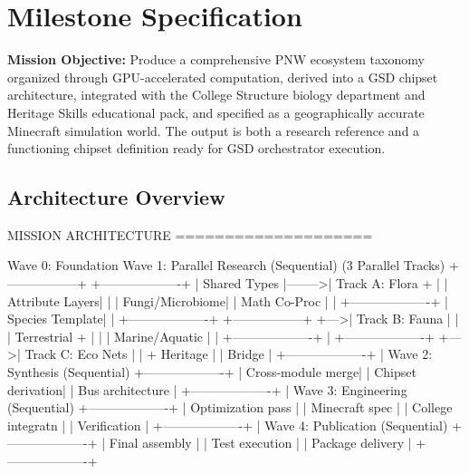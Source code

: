 \documentclass[11pt,letterpaper]{article}
\newcommand{\metafield}[2]{\textbf{\sffamily #1} #2\par}
\begin{document}
\section{Milestone Specification}

\metafield{Mission Objective:}{Produce a comprehensive PNW ecosystem taxonomy organized through GPU-accelerated computation, derived into a GSD chipset architecture, integrated with the College Structure biology department and Heritage Skills educational pack, and specified as a geographically accurate Minecraft simulation world. The output is both a research reference and a functioning chipset definition ready for GSD orchestrator execution.}

\subsection{Architecture Overview}

\begin{asciibox}
                    MISSION ARCHITECTURE
                    ====================

  Wave 0: Foundation           Wave 1: Parallel Research
  (Sequential)                 (3 Parallel Tracks)
  +-----------------+         +-------------------+
  | Shared Types    |-------->| Track A: Flora +  |
  | Attribute Layers|    |    |   Fungi/Microbiome|
  | Math Co-Proc    |    |    +-------------------+
  | Species Template|    |    +-------------------+
  +-----------------+    +--->| Track B: Fauna    |
                         |    |   Terrestrial +   |
                         |    |   Marine/Aquatic   |
                         |    +-------------------+
                         |    +-------------------+
                         +--->| Track C: Eco Nets |
                              |   + Heritage      |
                              |   Bridge          |
                              +-------------------+
                                       |
                              Wave 2: Synthesis (Sequential)
                              +-------------------+
                              | Cross-module merge|
                              | Chipset derivation|
                              | Bus architecture  |
                              +-------------------+
                                       |
                              Wave 3: Engineering (Sequential)
                              +-------------------+
                              | Optimization pass |
                              | Minecraft spec    |
                              | College integratn |
                              | Verification      |
                              +-------------------+
                                       |
                              Wave 4: Publication (Sequential)
                              +-------------------+
                              | Final assembly    |
                              | Test execution    |
                              | Package delivery  |
                              +-------------------+
\end{asciibox}
\end{document}
